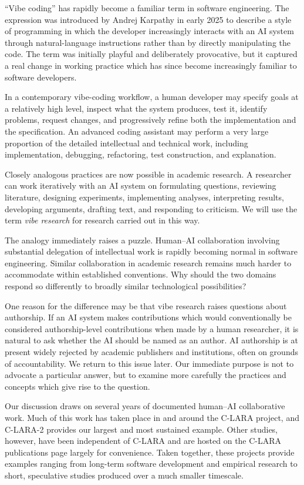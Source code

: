 ``Vibe coding'' has rapidly become a familiar term in software engineering. The expression was introduced by Andrej Karpathy in early 2025 to describe a style of programming in which the developer increasingly interacts with an AI system through natural-language instructions rather than by directly manipulating the code. The term was initially playful and deliberately provocative, but it captured a real change in working practice which has since become increasingly familiar to software developers.

In a contemporary vibe-coding workflow, a human developer may specify goals at a relatively high level, inspect what the system produces, test it, identify problems, request changes, and progressively refine both the implementation and the specification. An advanced coding assistant may perform a very large proportion of the detailed intellectual and technical work, including implementation, debugging, refactoring, test construction, and explanation.

Closely analogous practices are now possible in academic research. A researcher can work iteratively with an AI system on formulating questions, reviewing literature, designing experiments, implementing analyses, interpreting results, developing arguments, drafting text, and responding to criticism. We will use the term \emph{vibe research} for research carried out in this way.

The analogy immediately raises a puzzle. Human--AI collaboration involving substantial delegation of intellectual work is rapidly becoming normal in software engineering. Similar collaboration in academic research remains much harder to accommodate within established conventions. Why should the two domains respond so differently to broadly similar technological possibilities?

One reason for the difference may be that vibe research raises questions about authorship. If an AI system makes contributions which would conventionally be considered authorship-level contributions when made by a human researcher, it is natural to ask whether the AI should be named as an author. AI authorship is at present widely rejected by academic publishers and institutions, often on grounds of accountability. We return to this issue later. Our immediate purpose is not to advocate a particular answer, but to examine more carefully the practices and concepts which give rise to the question.

Our discussion draws on several years of documented human--AI collaborative work. Much of this work has taken place in and around the C-LARA project, and C-LARA-2 provides our largest and most sustained example. Other studies, however, have been independent of C-LARA and are hosted on the C-LARA publications page largely for convenience. Taken together, these projects provide examples ranging from long-term software development and empirical research to short, speculative studies produced over a much smaller timescale.

